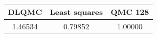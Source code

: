 \begin{tabular}{|c|c|c|}
\hline
DLQMC&Least squares&QMC 128\\ 
\hline

1.46534 & 0.79852 & 1.00000\\ 
\hline
\end{tabular}

